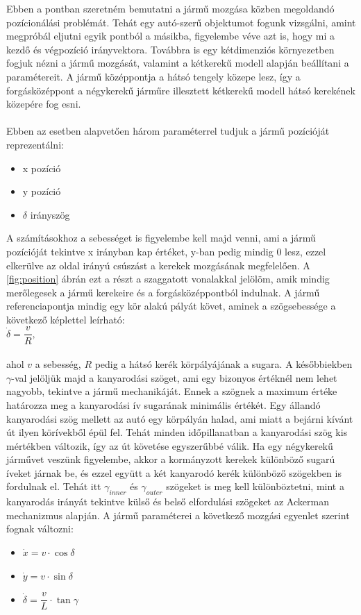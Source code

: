 Ebben a pontban szeretném bemutatni a jármű mozgása közben megoldandó pozícionálási problémát. Tehát egy autó-szerű objektumot fogunk vizsgálni, amint megpróbál eljutni egyik pontból a másikba, figyelembe véve azt is, hogy mi a kezdő és végpozíció irányvektora. Továbbra is egy kétdimenziós környezetben fogjuk nézni a jármű mozgását, valamint a kétkerekű modell alapján beállítani a paramétereit. A jármű középpontja a hátsó tengely közepe lesz, így a forgásközéppont a négykerekű járműre illesztett kétkerekű modell hátsó kerekének közepére fog esni. \\\\
Ebben az esetben alapvetően három paraméterrel tudjuk a jármű pozícióját reprezentálni:
\begin{itemize}
	\item x pozíció
	\item y pozíció
	\item $ \delta $ irányszög
\end{itemize}
A számításokhoz a sebességet is figyelembe kell majd venni, ami a jármű pozícióját tekintve x irányban kap értéket, y-ban pedig mindig 0 lesz, ezzel elkerülve az oldal irányú csúszást a kerekek mozgásának megfelelően. A \ref{fig:position} ábrán ezt a részt a szaggatott vonalakkal jelölöm, amik mindig merőlegesek a jármű kerekeire és a forgásközéppontból indulnak. A jármű referenciapontja mindig egy kör alakú pályát követ, aminek a szögsebessége a következő képlettel leírható:\\

$\dot{\delta} = \dfrac{v}{R},$ \\\\
ahol $ v $ a sebesség, $ R $ pedig a hátsó kerék körpályájának a sugara. A későbbiekben $ \gamma $-val jelöljük majd a kanyarodási szöget, ami egy bizonyos értéknél nem lehet nagyobb, tekintve a jármű mechanikáját. Ennek a szögnek a maximum értéke határozza meg a kanyarodási ív sugarának minimális értékét. Egy állandó kanyarodási szög mellett az autó egy körpályán halad, ami miatt a bejárni kívánt út ilyen körívekből épül fel. Tehát minden időpillanatban a kanyarodási szög kis mértékben változik, így az út követése egyszerűbbé válik. Ha egy négykerekű járművet veszünk figyelembe, akkor a kormányzott kerekek különböző sugarú íveket járnak be, és ezzel együtt a két kanyarodó kerék különböző szögekben is fordulnak el. Tehát itt $ \gamma_{inner} $  és $ \gamma_{outer} $ szögeket is meg kell különböztetni, mint a kanyarodás irányát tekintve külső és belső elfordulási szögeket az Ackerman mechanizmus alapján. 
A jármű paraméterei a következő mozgási egyenlet szerint fognak változni:
\begin{itemize}
	\item[] $ \dot{x} = v \cdot \cos\delta $
	\item[] $ \dot{y} = v \cdot \sin\delta $
	\item[] $ \dot{\delta} = \dfrac{v}{L} \cdot \tan\gamma $
\end{itemize}

